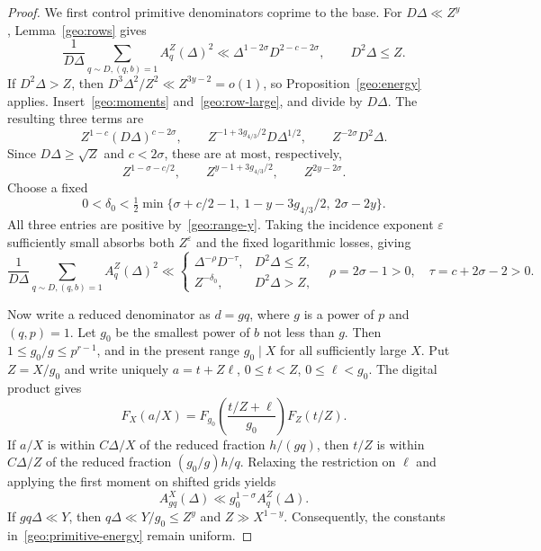 \documentclass[11pt,a4paper]{article}
\theoremstyle{paperplain}
\numberwithin{equation}{section}
\begin{document}
\begin{proof}
We first control primitive denominators coprime to the base.
For $D\Delta\ll Z^y$, Lemma~\ref{geo:rows} gives
\begin{equation}\label{geo:small-energy}
 \frac1{D\Delta}\sum_{q\sim D,(q,b)=1}A_q^Z(\Delta)^2
 \ll\Delta^{1-2\sigma}D^{2-c-2\sigma},
 \qquad D^2\Delta\le Z.
\end{equation}
If $D^2\Delta>Z$, then
$D^3\Delta^2/Z^2\ll Z^{3y-2}=o(1)$, so Proposition~\ref{geo:energy} applies.
Insert~\eqref{geo:moments} and~\eqref{geo:row-large}, and divide by $D\Delta$.
The resulting three terms are
\[
 Z^{1-c}(D\Delta)^{c-2\sigma},\qquad
 Z^{-1+3g_{4/3}/2}D\Delta^{1/2},\qquad
 Z^{-2\sigma}D^2\Delta.
\]
Since $D\Delta\ge\sqrt Z$ and $c<2\sigma$, these are at most, respectively,
\begin{equation}\label{geo:three-powers}
 Z^{1-\sigma-c/2},\qquad Z^{y-1+3g_{4/3}/2},\qquad
 Z^{2y-2\sigma}.
\end{equation}
Choose a fixed
\[
 0<\delta_0<
 \tfrac12\min\{\sigma+c/2-1,\ 1-y-3g_{4/3}/2,\ 2\sigma-2y\}.
\]
All three entries are positive by~\eqref{geo:range-y}.
Taking the incidence exponent $\varepsilon$ sufficiently small absorbs
both $Z^\varepsilon$ and the fixed logarithmic losses, giving
\begin{equation}\label{geo:primitive-energy}
 \frac1{D\Delta}\sum_{q\sim D,(q,b)=1}A_q^Z(\Delta)^2
 \ll
 \begin{cases}
 \Delta^{-\rho}D^{-\tau},&D^2\Delta\le Z,\\
 Z^{-\delta_0},&D^2\Delta>Z,
 \end{cases}
 \quad
 \rho=2\sigma-1>0,\quad\tau=c+2\sigma-2>0.
\end{equation}

Now write a reduced denominator as $d=gq$, where $g$ is a power of $p$ and
$(q,p)=1$. Let $g_0$ be the smallest power of $b$ not less than $g$.
Then $1\le g_0/g\le p^{r-1}$, and in the present range $g_0\mid X$ for all
sufficiently large $X$.
Put $Z=X/g_0$ and write uniquely
$a=t+Z\ell$, $0\le t<Z$, $0\le\ell<g_0$.
The digital product gives
\begin{equation}\label{geo:smooth-fiber}
 F_X(a/X)=F_{g_0}\left(\frac{t/Z+\ell}{g_0}\right)F_Z(t/Z).
\end{equation}
If $a/X$ is within $C\Delta/X$ of the reduced fraction $h/(gq)$, then $t/Z$
is within $C\Delta/Z$ of the reduced fraction $(g_0/g)h/q$.
Relaxing the restriction on $\ell$ and applying the first moment on shifted
grids yields
\begin{equation}\label{geo:fiber-row}
 A_{gq}^X(\Delta)\ll g_0^{1-\sigma}A_q^Z(\Delta).
\end{equation}
If $gq\Delta\ll Y$, then
$q\Delta\ll Y/g_0\le Z^y$ and $Z\gg X^{1-y}$.
Consequently, the constants in~\eqref{geo:primitive-energy} remain uniform.


\end{proof}
\end{document}
